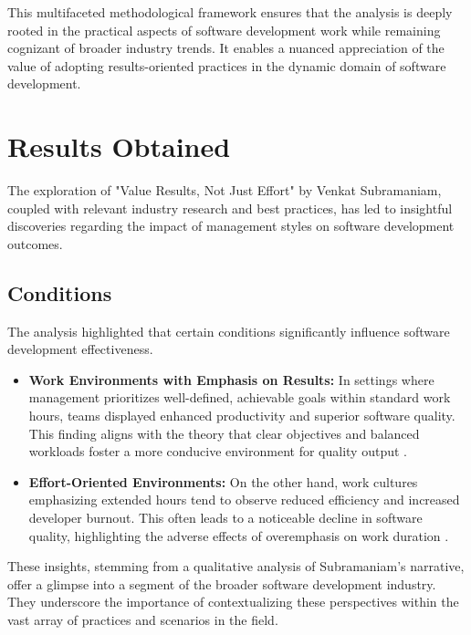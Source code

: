 \documentclass{article}
\begin{document}
This multifaceted methodological framework ensures that the analysis is deeply rooted in the practical aspects of software development work while remaining cognizant of broader industry trends. It enables a nuanced appreciation of the value of adopting results-oriented practices in the dynamic domain of software development.

\newpage
\section{Results Obtained}

The exploration of "Value Results, Not Just Effort" by Venkat Subramaniam, coupled with relevant industry research and best practices, has led to insightful discoveries regarding the impact of management styles on software development outcomes.

\subsection{Conditions}
The analysis highlighted that certain conditions significantly influence software development effectiveness.
\begin{itemize}
    \item \textbf{Work Environments with Emphasis on Results:} In settings where management prioritizes well-defined, achievable goals within standard work hours, teams displayed enhanced productivity and superior software quality. This finding aligns with the theory that clear objectives and balanced workloads foster a more conducive environment for quality output \cite{WagnerDeissenboeck2019}.
    \item \textbf{Effort-Oriented Environments:} On the other hand, work cultures emphasizing extended hours tend to observe reduced efficiency and increased developer burnout. This often leads to a noticeable decline in software quality, highlighting the adverse effects of overemphasis on work duration \cite{Carmichael2015, SinghSuarLeiter2012}.
\end{itemize}

These insights, stemming from a qualitative analysis of Subramaniam's narrative, offer a glimpse into a segment of the broader software development industry. They underscore the importance of contextualizing these perspectives within the vast array of practices and scenarios in the field.
\end{document}
